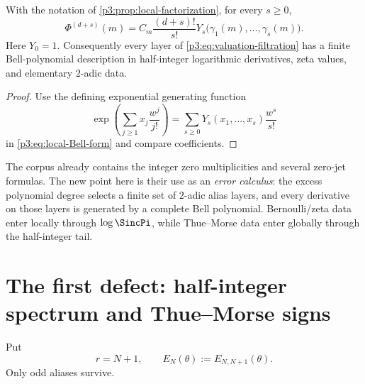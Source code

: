 \documentclass[11pt,oneside]{article}
\numberwithin{equation}{section}
\theoremstyle{definition}
\theoremstyle{remark}
\begin{document}
\begin{corollary}
\label{p3:cor:Bell-zero-jets}
With the notation of \cref{p3:prop:local-factorization}, for every $s\ge0$,
\begin{equation}
 \boxed{\displaystyle
 \Phi^{(d+s)}(m)
 =C_m\frac{(d+s)!}{s!}
 Y_s\bigl(\gamma_1(m),\ldots,\gamma_s(m)\bigr).}
 \label{p3:eq:Bell-zero-jets}
\end{equation}
Here $Y_0=1$.  Consequently every layer of \eqref{p3:eq:valuation-filtration} has a finite Bell-polynomial description in half-integer logarithmic derivatives, zeta values, and elementary $2$-adic data.
\end{corollary}

\begin{proof}
Use the defining exponential generating function
\[
 \exp\!\left(\sum_{j\ge1}x_j\frac{w^j}{j!}\right)
 =\sum_{s\ge0}Y_s(x_1,\ldots,x_s)\frac{w^s}{s!}
\]
in \eqref{p3:eq:local-Bell-form} and compare coefficients.
\end{proof}

\begin{resultbox}
The corpus already contains the integer zero multiplicities and several zero-jet formulas.  The new point here is their use as an \emph{error calculus}: the excess polynomial degree selects a finite set of $2$-adic alias layers, and every derivative on those layers is generated by a complete Bell polynomial.  Bernoulli/zeta data enter locally through $\log\SincPi$, while Thue--Morse data enter globally through the half-integer tail.
\end{resultbox}

\section{The first defect: half-integer spectrum and Thue--Morse signs}
\label{p3:sec:first-defect}

Put
\begin{equation}
 r=N+1,
 \qquad
 E_N(\theta):=E_{N,N+1}(\theta).
 \label{p3:eq:first-defect-def}
\end{equation}
Only odd aliases survive.
\end{document}
